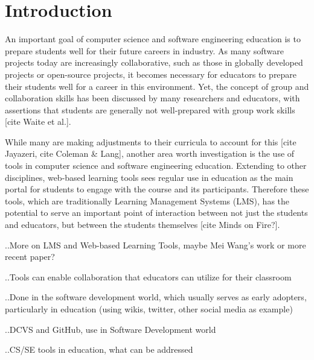 \chapter{Introduction}

An important goal of computer science and software engineering education is to prepare students well for their future careers in industry. As many software projects today are increasingly collaborative, such as those in globally developed projects or open-source projects, it becomes necessary for educators to prepare their students well for a career in this environment. Yet, the concept of group and collaboration skills has been discussed by many researchers and educators, with assertions that students are generally not well-prepared with group work skills [cite Waite et al.].

While many are making adjustments to their curricula to account for this [cite Jayazeri, cite Coleman & Lang], another area worth investigation is the use of tools in computer science and software engineering education. Extending to other disciplines, web-based learning tools sees regular use in education as the main portal for students to engage with the course and its participants. Therefore these tools, which are traditionally Learning Management Systems (LMS), has the potential to serve an important point of interaction between not just the students and educators, but between the students themselves [cite Minds on Fire?].

..More on LMS and Web-based Learning Tools, maybe Mei Wang's work or more recent paper?

..Tools can enable collaboration that educators can utilize for their classroom

..Done in the software development world, which usually serves as early adopters, particularly in education (using wikis, twitter, other social media as example)

..DCVS and GitHub, use in Software Development world

..CS/SE tools in education, what can be addressed
